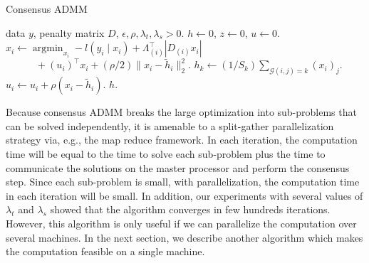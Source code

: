 \documentclass{article}
\DeclareMathOperator*{\argmin}{argmin}
\newcommand{\attn}[1]{\textcolor{red}{TODO: #1}}
\newcommand{\given}{\;\vert\;}
\newcommand{\norm}[1]{\left\lVert #1 \right\rVert}
\begin{document}
\begin{algorithm}[tb]
  \caption{Consensus ADMM }
  \label{alg:conADMM}
  \begin{algorithmic}
     data $y$, penalty matrix $D$, 
    $\epsilon, \rho,\lambda_t,\lambda_s >0$.
     $h\leftarrow 0$, $z\leftarrow 0$, $u\leftarrow
    0$.  
    \REPEAT
    \STATE $x_i\leftarrow\argmin_{x_i} -l(y_i\given
    x_i)+\Lambda_{(i)}^\top |D_{(i)}x_i|$
    \STATE $\quad\quad\quad+ (u_i)^\top x_i +
    (\rho/2)  \lVert x_i-\tilde{h}_i \rVert_2^2$. 
    \STATE $h_k\leftarrow (1/S_k)\sum_{\mathscr{G}(i,j)=k} (x_i)_j
    $. 
    \STATE $ u_i\leftarrow u_i + \rho (x_i-\tilde{h}_i)$. 
    \UNTIL {$\norm{h^{m+1}-h^m}_2^2\ < \epsilon$}
     $h$.
  \end{algorithmic}
\end{algorithm}



Because consensus ADMM breaks the large optimization into
sub-problems that can be solved independently, it is amenable to a
split-gather parallelization strategy via, e.g., the map reduce framework.
In each iteration, the
computation time will be equal to the time to solve each sub-problem
plus the time to communicate the solutions on the master processor
and perform the consensus step. Since each sub-problem is
small, with parallelization, the computation time in each iteration
will be small. In addition, our experiments with several values of
$\lambda_t$ and $\lambda_s$ showed that the algorithm converges in few
hundreds iterations. 
However, this algorithm is only useful if we can parallelize the
computation over several machines. In the next section, we describe
another algorithm which makes the computation feasible on a single
machine. 
\end{document}
